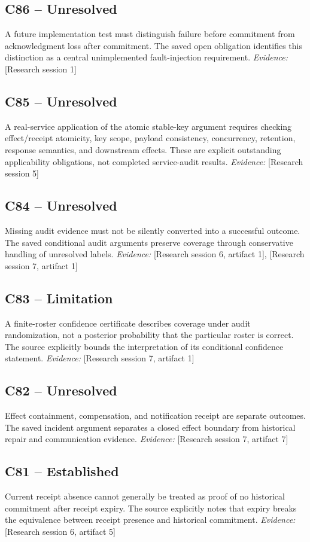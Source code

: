 \documentclass[11pt]{article}
\begin{document}
\begin{sloppypar}
\subsection{C86 -- Unresolved}
A future implementation test must distinguish failure before commitment from acknowledgment loss after commitment.
The saved open obligation identifies this distinction as a central unimplemented fault-injection requirement.
\textit{Evidence: }[Research session 1]
\subsection{C85 -- Unresolved}
A real-service application of the atomic stable-key argument requires checking effect/receipt atomicity, key scope, payload consistency, concurrency, retention, response semantics, and downstream effects.
These are explicit outstanding applicability obligations, not completed service-audit results.
\textit{Evidence: }[Research session 5]
\subsection{C84 -- Unresolved}
Missing audit evidence must not be silently converted into a successful outcome.
The saved conditional audit arguments preserve coverage through conservative handling of unresolved labels.
\textit{Evidence: }[Research session 6, artifact 1], [Research session 7, artifact 1]
\subsection{C83 -- Limitation}
A finite-roster confidence certificate describes coverage under audit randomization, not a posterior probability that the particular roster is correct.
The source explicitly bounds the interpretation of its conditional confidence statement.
\textit{Evidence: }[Research session 7, artifact 1]
\subsection{C82 -- Unresolved}
Effect containment, compensation, and notification receipt are separate outcomes.
The saved incident argument separates a closed effect boundary from historical repair and communication evidence.
\textit{Evidence: }[Research session 7, artifact 7]
\subsection{C81 -- Established}
Current receipt absence cannot generally be treated as proof of no historical commitment after receipt expiry.
The source explicitly notes that expiry breaks the equivalence between receipt presence and historical commitment.
\textit{Evidence: }[Research session 6, artifact 5]

\end{sloppypar}
\end{document}
